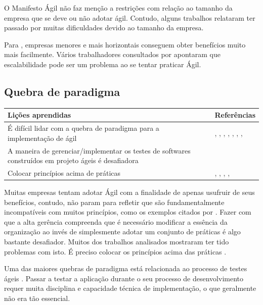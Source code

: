 O Manifesto Ágil não faz menção a restrições com relação ao tamanho da empresa que se deve ou não adotar ágil. Contudo, alguns trabalhos relataram ter passado por muitas dificuldades devido ao tamanho da empresa.

Para \cite{Bustard2013}, empresas menores e mais horizontais conseguem obter benefícios muito mais facilmente. Vários trabalhadores consultados por \cite{Microsoft2013} apontaram que escalabilidade pode ser um problema ao se tentar praticar Ágil.

\subsection{Quebra de paradigma}

\begin{table}[H]
	\centering
	\begin{tabularx}{\linewidth}{ | X | p{5cm} | } \hline \textbf{Lições aprendidas} & \textbf{Referências} \\ \hline
		É difícil lidar com a quebra de paradigma para a implementação de ágil & \cite{Hajjdiab2011}, \cite{Block2011}, \cite{Korhonen2010}, \cite{Lapham2012}, \cite{Arikpo2011}, \cite{Stefano2013}, \cite{Bastos2013}, \cite{Maciel2013} \\ \hline
		A maneira de gerenciar/implementar os testes de softwares construídos em projeto ágeis é desafiadora & \cite{Korhonen2010} \\ \hline
		Colocar princípios acima de práticas & \cite{Maciel2013}, \cite{Parzinello2012}, \cite{Hui2013}, \cite{Ahmed2008}, \cite{Sahota2012} \\ \hline
	\end{tabularx}
\end{table}

Muitas empresas tentam adotar Ágil com a finalidade de apenas usufruir de seus benefícios, contudo, não param para refletir que são fundamentalmente incompatíveis com muitos princípios, como os exemplos citados por \cite{Lapham2012,Bastos2013}. Fazer com que a alta gerência compreenda que é necessário modificar a essência da organização ao invés de simplesmente adotar um conjunto de práticas é algo bastante desafiador. Muitos dos trabalhos analisados mostraram ter tido problemas com isto. É preciso colocar os princípios acima das práticas \cite{Maciel2013}.

Uma das maiores quebras de paradigma está relacionada ao processo de testes ágeis \cite{Korhonen2010}. Passar a testar a aplicação durante o seu processo de desenvolvimento requer muita disciplina e capacidade técnica de implementação, o que geralmente não era tão essencial.

